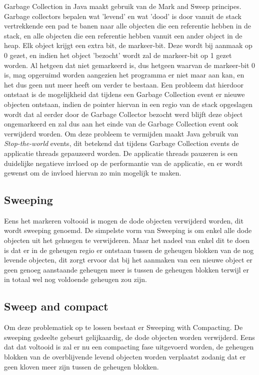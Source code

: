Garbage Collection in Java maakt gebruik van de Mark and Sweep principes.
Garbage collectors bepalen wat 'levend' en wat 'dood' is door vanuit de stack vertrekkende een pad te banen naar alle objecten die een referentie hebben in de stack, en alle objecten die een referentie hebben vanuit een ander object in de heap.
Elk object krijgt een extra bit, de markeer-bit. Deze wordt bij aanmaak op 0 gezet, en indien het object 'bezocht' wordt zal de markeer-bit op 1 gezet worden.
Al hetgeen dat niet gemarkeerd is, dus hetgeen waarvan de markeer-bit 0 is, mag opgeruimd worden aangezien het programma er niet maar aan kan, en het dus geen nut meer heeft om verder te bestaan.
Een probleem dat hierdoor ontstaat is de mogelijkheid dat tijdens een Garbage Collection event er nieuwe objecten ontstaan, indien de pointer hiervan in een regio van de stack opgeslagen wordt dat al eerder door de Garbage Collector bezocht werd blijft deze object ongemarkeerd en zal dus aan het einde van de Garbage Collection event ook verwijderd worden.
Om deze probleem te vermijden maakt Java gebruik van \textit{Stop-the-world} events, dit betekend dat tijdens Garbage Collection events de applicatie threads gepauzeerd worden.
De applicatie threads pauzeren is een duidelijke negatieve invloed op de performantie van de applicatie, en er wordt gewenst om de invloed hiervan zo min mogelijk te maken.
\autocite{Putten2022}


\subsection{Sweeping}
Eens het markeren voltooid is mogen de dode objecten verwijderd worden, dit wordt sweeping genoemd.
De simpelste vorm van Sweeping is om enkel alle dode objecten uit het gehuegen te verwijderen.
Maar het nadeel van enkel dit te doen is dat er in de geheugen regio er %
ontstaan tussen de geheugen blokken van de nog levende objecten, dit zorgt ervoor dat bij het aanmaken van een nieuwe object er geen genoeg aanstaande geheugen meer is tussen de geheugen blokken terwijl er in totaal wel nog voldoende geheugen zou zijn.
\subsection{Sweep and compact}
Om deze problematiek op te lossen bestaat er Sweeping with Compacting.
De sweeping gedeelte gebeurt gelijkaardig, de dode objecten worden verwijderd.
Eens dat dat voltooid is zal er nu een compacting fase uitgevoerd worden, de geheugen blokken van de overblijvende levend objecten worden verplaatst zodanig dat er geen kloven meer zijn tussen de geheugen blokken.
